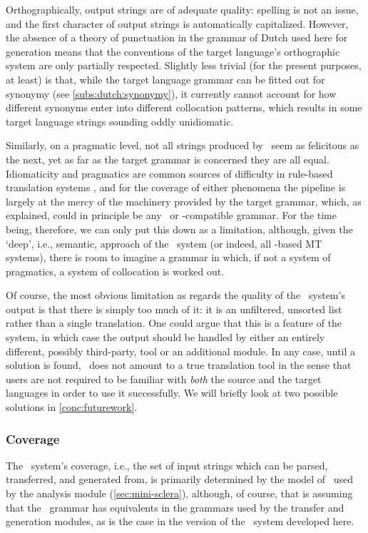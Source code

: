 Orthographically, output strings are of adequate quality: spelling is not an
issue, and the first character of output strings is automatically capitalized.
However, the absence of a theory of punctuation in the grammar of Dutch used
here for generation means that the conventions of the target language's
orthographic system are only partially respected. Slightly less trivial (for
the present purposes, at least) is that, while the target language grammar can
be fitted out for synonymy (see \cref{subs:dutch:synonymy}), it currently
cannot account for how different synonyms enter into different collocation
patterns, which results in some target language strings sounding oddly
unidiomatic.

Similarly, on a pragmatic level, not all strings produced by \depicto\ seem as
felicitous as the next, yet as far as the target grammar is concerned they are
all equal. Idiomaticity and pragmatics are common sources of difficulty in
rule-based translation systems \citep{chan2014routledge}, and for the coverage
of either phenomena the pipeline is largely at the mercy of the machinery
provided by the target grammar, which, as explained, could in principle be any
\delphin\ or \mrs-compatible grammar. For the time being, therefore, we can
only put this down as a limitation, although, given the `deep', i.e., semantic,
approach of the \depicto\ system (or indeed, all \logon-based MT systems),
there is room to imagine a grammar in which, if not a system of pragmatics, a
system of collocation is worked out.

Of course, the most obvious limitation as regards the quality of the \depicto\
system's output is that there is simply too much of it: it is an unfiltered,
unsorted list rather than a single translation. One could argue that this is a
feature of the system, in which case the output should be handled by either an
entirely different, possibly third-party, tool or an additional module. In any
case, until a solution is found, \depicto\ does not amount to a true
translation tool in the sense that users are not required to be familiar with
\emph{both} the source and the target languages in order to use it
successfully. We will briefly look at two possible solutions in
\cref{conc:futurework}.

\subsubsection{Coverage}

The \depicto\ system's coverage, i.e., the set of input strings which can be
parsed, transferred, and generated from, is primarily determined by the model
of \sclera\ used by the analysis module (\cref{sec:mini-sclera}), although, of
course, that is assuming that the \sclera\ grammar has equivalents in the
grammars used by the transfer and generation modules, as is the case in the
version of the \depicto\ system developed here.

